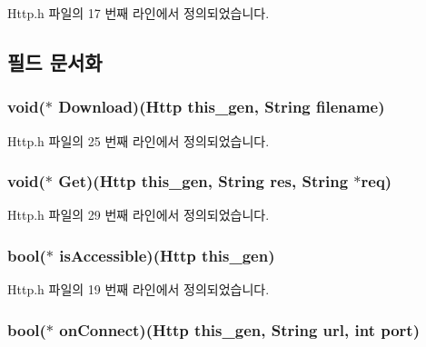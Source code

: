 Http.\-h 파일의 17 번째 라인에서 정의되었습니다.



\subsection{필드 문서화}
\hypertarget{struct___http_a5c2263401d4e2ad7e91fa5189b2a60e1}{
\subsubsection[{Download}]{\setlength{\rightskip}{0pt plus 5cm}void($\ast$  Download)({\bf Http} this\-\_\-gen, {\bf String} filename)}}\label{struct___http_a5c2263401d4e2ad7e91fa5189b2a60e1}


Http.\-h 파일의 25 번째 라인에서 정의되었습니다.

\hypertarget{struct___http_a7d476aeddf2c20ee482845959c71446b}{
\subsubsection[{Get}]{\setlength{\rightskip}{0pt plus 5cm}void($\ast$  Get)({\bf Http} this\-\_\-gen, {\bf String} res, {\bf String} $\ast$req)}}\label{struct___http_a7d476aeddf2c20ee482845959c71446b}


Http.\-h 파일의 29 번째 라인에서 정의되었습니다.

\hypertarget{struct___http_a3f21ba58588b0d2e11e7611caf3fa65c}{
\subsubsection[{is\-Accessible}]{\setlength{\rightskip}{0pt plus 5cm}bool($\ast$  is\-Accessible)({\bf Http} this\-\_\-gen)}}\label{struct___http_a3f21ba58588b0d2e11e7611caf3fa65c}


Http.\-h 파일의 19 번째 라인에서 정의되었습니다.

\hypertarget{struct___http_a952cc07a3505431bf33a7a6393a1503a}{
\subsubsection[{on\-Connect}]{\setlength{\rightskip}{0pt plus 5cm}bool($\ast$  on\-Connect)({\bf Http} this\-\_\-gen, {\bf String} url, int port)}}\label{struct___http_a952cc07a3505431bf33a7a6393a1503a}


